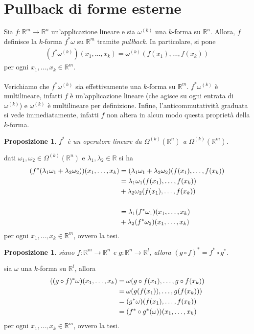 \documentclass[twoside, 11pt]{amsbook}
\makeatletter
\newcommand{\0}{{(0)}}
\newcommand{\3}{{(3)}}
\theoremstyle{colonplain}
\newtheorem{prop}[thm]{Proposizione}
\theoremstyle{colondefinition}
\theoremstyle{colonremark}
\numberwithin{equation}{chapter}
\renewcommand{\proofname}{Dimostrazione}
\renewenvironment{proof}[1][\proofname]{\par
  \pushQED{\qed}%
  \normalfont \topsep6\p@\@plus6\p@\relax
  \trivlist
  \item[\hskip\labelsep\bfseries #1:]\ignorespaces
}{%
  \popQED\endtrivlist\@endpefalse
}
\makeatother
\begin{document}
\section{Pullback di forme esterne}
Sia $f : \mathbb{R}^m \longrightarrow \mathbb{R}^n$ un'applicazione lineare e sia $\omega^{(k)}$ una $k$-forma su $\mathbb{R}^n$. Allora, $f$ definisce la $k$-forma $f^*\omega$ su $\mathbb{R}^m$ tramite \textit{pullback}. In particolare, si pone
\begin{align}
    (f^*\omega^{(k)})(x_1, \dots, x_k) = \omega^{(k)}(f(x_1), \dots, f(x_k)) 
\end{align}
per ogni $x_1, \dots, x_k \in \mathbb{R}^m$. \\ \\
Verichiamo che $f^*\omega^{(k)}$ sia effettivamente una $k$-forma su $\mathbb{R}^m$. $f^*\omega^{(k)}$ è multilineare, infatti $f$ è un'applicazione lineare (che agisce su ogni entrata di $\omega^{(k)}$) e $\omega^{(k)}$ è multilineare per definizione. Infine, l'anticommutatività graduata si vede immediatamente, infatti $f$ non altera in alcun modo questa proprietà della $k$-forma.
\begin{prop} $f^*$ è un operatore lineare da $\Omega^{(k)}(\mathbb{R}^n)$ a $\Omega^{(k)}(\mathbb{R}^m)$.
\end{prop}
\begin{proof} dati $\omega_1, \omega_2 \in \Omega^{(k)}(\mathbb{R}^n)$ e $\lambda_1, \lambda_2 \in \mathbb{R}$ si ha
\begin{align}
    (f^*(\lambda_1\omega_1 + \lambda_2\omega_2))(x_1, \dots, x_k) &= (\lambda_1\omega_1 + \lambda_2\omega_2)(f(x_1), \dots, f(x_k)) \notag \\
    &= \lambda_1\omega_1(f(x_1), \dots, f(x_k)) \notag \\
    &+ \lambda_2\omega_2(f(x_1), \dots, f(x_k)) \notag \\ \notag \\
    &= \lambda_1(f^*\omega_1)(x_1, \dots, x_k) \notag \\
    &+ \lambda_2(f^*\omega_2)(x_1, \dots, x_k) 
\end{align}
per ogni $x_1, \dots, x_k \in \mathbb{R}^m$, ovvero la tesi.
\end{proof}
\begin{prop} siano $f : \mathbb{R}^m \longrightarrow \mathbb{R}^n$ e $g : \mathbb{R}^n \longrightarrow \mathbb{R}^l$, allora $(g \circ f)^* = f^* \circ g^*$.
\end{prop}
\begin{proof} sia $\omega$ una $k$-forma su $\mathbb{R}^l$, allora 
\begin{align}
    ((g \circ f)^*\omega)(x_1, \dots, x_k) &= \omega(g \circ f(x_1), \dots, g \circ f(x_k)) \notag \\
    &= \omega(g(f(x_1)), \dots, g(f(x_k))) \notag \\
    &= (g^*\omega)(f(x_1), \dots, f(x_k)) \notag \\
    &= (f^* \circ g^*(\omega))(x_1, \dots, x_k) 
\end{align}
per ogni $x_1, \dots, x_k \in \mathbb{R}^m$, ovvero la tesi.
\end{proof}
\end{document}
